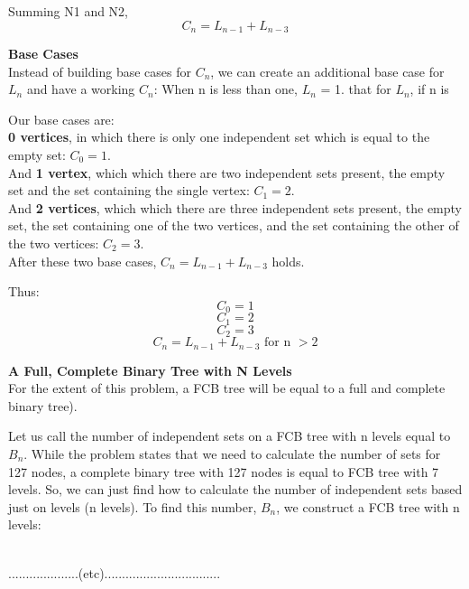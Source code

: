 \documentclass[11pt, solution, letterpaper]{format}
\begin{document}
Summing N1 and N2, 
$$C_n = L_{n - 1} + L_{n - 3}$$

\textbf{Base Cases}\\
Instead of building base cases for $C_n$, we can create an additional base case for $L_n$ and have a working $C_n$:
When n is less than one, $L_n$ = 1.
that for $L_n$, if n is 

Our base cases are: \\
\textbf{0 vertices}, in which there is only one independent set which is equal to the empty set: $C_0 = 1$.\\
And \textbf{1 vertex}, which which there are two independent sets present, the empty set and the set containing the single vertex: $C_1 = 2$.\\
And \textbf{2 vertices}, which which there are three independent sets present, the empty set, the set containing one of the two vertices, and the set containing the other of the two vertices: $C_2 = 3$.\\


After these two base cases,
$C_n = L_{n - 1} + L_{n - 3}$ holds.

Thus:
$$C_0 = 1$$$$C_1 = 2$$$$C_2 = 3$$$$C_n = L_{n - 1} + L_{n - 3} \text{ for n }> 2$$

\textbf{A Full, Complete Binary Tree with N Levels}\\
For the extent of this problem, a FCB tree will be equal to a full and complete binary tree).

Let us call the number of independent sets on a FCB tree with n levels equal to $B_n$. While the problem states that we need to calculate the number of sets for 127 nodes, a complete binary tree with 127 nodes is equal to FCB tree with 7 levels. So, we can just find how to calculate the number of independent sets based just on levels (n levels). To find this number, $B_n$, we construct a FCB tree with n levels:\\
\begin{center}
\\
....................(etc).................................
\end{center}
\end{document}
